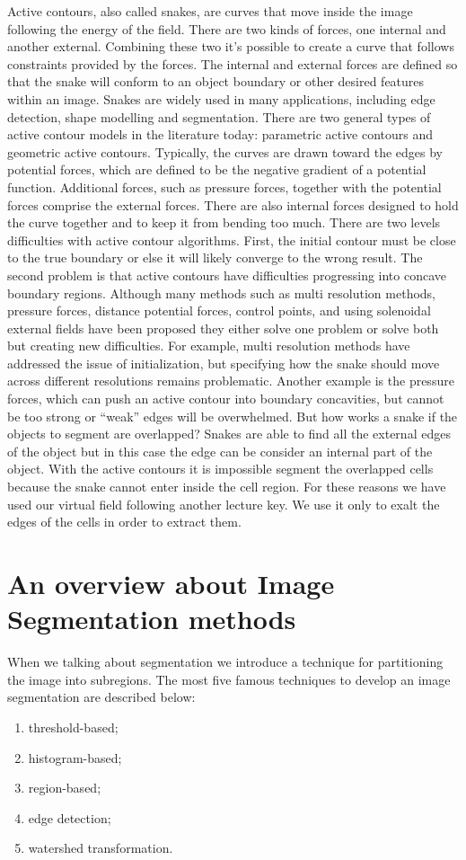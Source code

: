 Active contours, also called snakes, are curves that move inside the image following the energy of the field. There are two kinds of forces, one internal and another external. Combining these two it's possible to create a curve that follows constraints provided by the forces. The  internal  and  external  forces  are  defined  so  that  the  snake  will conform to an object boundary or other desired features within an image. Snakes are widely used  in  many  applications,  including  edge  detection,  shape  modelling and segmentation. There  are  two  general  types  of  active  contour  models  in  the literature  today:  parametric active contours and geometric active contours. Typically,  the  curves  are  drawn  toward  the edges  by  potential  forces,  which  are  defined  to  be  the  negative  gradient  of  a  potential function.  Additional  forces,  such  as  pressure  forces,  together  with  the  potential  forces comprise the external forces. There are also internal forces designed to hold the curve together and to keep it from bending too  much.  There  are  two  levels  difficulties  with  active  contour  algorithms.  First,  the  initial contour must be close to the true boundary or else it will likely converge to the wrong result. The second problem is that active contours have difficulties progressing into concave  boundary  regions.  Although  many  methods  such  as  multi resolution  methods, pressure forces, distance potential forces, control points, and using solenoidal external fields have been proposed they either solve one problem or solve both but creating new difficulties. For  example,  multi resolution  methods  have  addressed  the  issue  of  initialization,  but specifying  how  the  snake  should  move  across  different  resolutions  remains  problematic. Another example is the pressure forces, which can push an active contour into boundary concavities, but cannot be too strong or “weak” edges will be overwhelmed. But how works a snake if the objects to segment are overlapped? Snakes are able to find all the external edges of the object but in this case the edge can be consider an internal part of the object. With the active contours it is impossible segment the overlapped cells because the snake cannot enter inside the cell region. For these reasons we have used our virtual field following another lecture key. We use it only to exalt the edges of the cells in order to extract them.

\section{An overview about Image Segmentation methods}
When we talking about segmentation we introduce a technique for partitioning the image into subregions. The most five famous techniques to develop an image segmentation are described below:
\begin{enumerate}
	\item threshold-based;
	\item histogram-based;
	\item region-based;
	\item edge detection;
	\item watershed transformation.
\end{enumerate}

